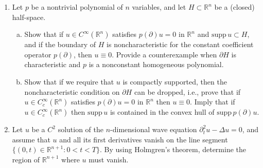 \documentclass[11pt]{amsart}
\newcommand{\R}{\mathbb{R}}
\newcommand{\supp}{\mathrm{supp}}
\begin{document}
\begin{enumerate}[1.]
\begin{enumerate}[a)]
\item
Prove that the set $\{\xi\in\R^n:p(\xi)=0\}$ is closed and of measure zero.
\item
Show that there is a neighbourhood of $0\in\R^n$,
on which the equation $p(\partial)u=f$ has a solution.
Supposing that $p(\xi)=\sum_{\alpha} a_\alpha \xi^\alpha$, here the operator $p(\partial)$ is given by 
$$
\textstyle p(\partial)=\sum_{\alpha} a_\alpha \partial^\alpha .
$$
\item
Extend this local solvability result to linear operators with analytic coefficients.
That is, assuming that $\{a_\alpha\}$ is a finite collection of real analytic functions in a neighbourhood of $0\in\R^n$,
with the property that $p(\xi)=\sum_\alpha a_\alpha(0)\xi^\alpha$ is a nontrivial polynomial,
show that the equation
$$
\textstyle \sum_{\alpha} a_\alpha \partial^\alpha u = f ,
$$
has a solution on a neighbourhood of $0\in\R^n$.
\end{enumerate}
\item
Let $p$ be a nontrivial polynomial of $n$ variables, and let $H\subset\R^n$ be a (closed) half-space.
\begin{enumerate}[a)]
\item
Show that if $u\in C^\infty(\R^n)$ satisfies $p(\partial)u=0$ in $\R^n$ and $\supp\,u\subset H$,
and if the boundary of $H$ is noncharacteristic for the constant coefficient operator $p(\partial)$,
then $u\equiv0$.
Provide a counterexample when $\partial H$ is characteristic and $p$ is a nonconstant homogeneous polynomial.
\item
Show that if we require that $u$ is compactly supported, then the noncharacteristic condition on $\partial H$ can be dropped,
i.e., prove that if $u\in C_c^\infty(\R^n)$ satisfies $p(\partial)u=0$ in $\R^n$ then $u\equiv0$.
Imply that if $u\in C^\infty_c(\R^n)$ then $\supp\,u$ is contained in the convex hull of $\supp\,p(\partial)u$.
\end{enumerate}
\item
Let $u$ be a $C^2$ solution of the $n$-dimensional wave equation $\partial_t^2 u - \Delta u = 0$,
and assume that $u$ and all its first derivatives vanish on the line segment $\{(0,t)\in\R^{n+1}:0<t<T\}$.
By using Holmgren's theorem, determine the region of $\R^{n+1}$ where $u$ must vanish.
\end{enumerate}
\end{document}
